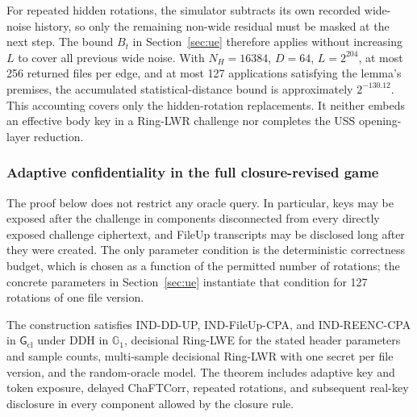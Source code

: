 For repeated hidden rotations, the simulator subtracts its own recorded wide-noise history, so only the remaining non-wide residual must be masked at the next step. The bound $B_t$ in Section~\ref{sec:ue} therefore applies without increasing $L$ to cover all previous wide noise. With $N_H=16384$, $D=64$, $L=2^{204}$, at most 256 returned files per edge, and at most 127 applications satisfying the lemma's premises, the accumulated statistical-distance bound is approximately $2^{-130.12}$. This accounting covers only the hidden-rotation replacements. It neither embeds an effective body key in a Ring-LWR challenge nor completes the USS opening-layer reduction.

\subsubsection{Adaptive confidentiality in the full closure-revised game}
\label{sec:adaptive-full}

The proof below does not restrict any oracle query. In particular, keys may be exposed after the challenge in components disconnected from every directly exposed challenge ciphertext, and FileUp transcripts may be disclosed long after they were created. The only parameter condition is the deterministic correctness budget, which is chosen as a function of the permitted number of rotations; the concrete parameters in Section~\ref{sec:ue} instantiate that condition for 127 rotations of one file version.

\begin{theorem}
\label{thm:adaptive-full}
The construction satisfies IND-DD-UP, IND-FileUp-CPA, and IND-REENC-CPA in $\mathsf G_{\mathrm{cl}}$ under DDH in $\mathbb G_1$, decisional Ring-LWE for the stated header parameters and sample counts, multi-sample decisional Ring-LWR with one secret per file version, and the random-oracle model. The theorem includes adaptive key and token exposure, delayed ChaFTCorr, repeated rotations, and subsequent real-key disclosure in every component allowed by the closure rule.
\end{theorem}

